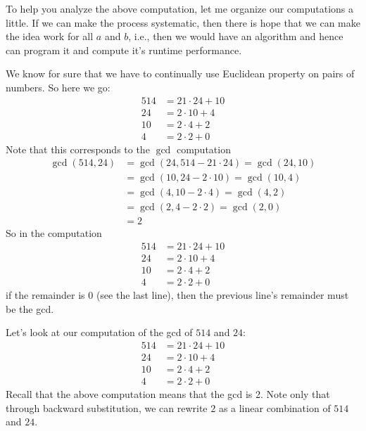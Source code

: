 \newpage
To help you analyze the above computation,
let me organize our computations a little.
If we can make the process systematic, then there is hope that we can 
make the idea work for all $a$ and $b$, i.e., then we would have an
algorithm and hence can program it and compute it's runtime performance.

We know for sure that we have to continually use
Euclidean property on pairs of numbers.
So here we go:
\begin{align*}
514 &= 21 \cdot 24 + 10 \\
24  &= 2 \cdot 10 + 4 \\
10  &= 2 \cdot 4 + 2 \\
4   &= 2 \cdot 2 + 0
\end{align*}
Note that this corresponds to the $\gcd$ computation
\begin{align*}
\gcd(514, 24) 
&= \gcd(24, 514 - 21 \cdot 24) = \gcd(24, 10) \\
&= \gcd(10, 24 - 2 \cdot 10) = \gcd(10, 4) \\
&= \gcd(4, 10 - 2 \cdot 4) = \gcd(4, 2)  \\
&= \gcd(2, 4 - 2\cdot 2) = \gcd(2, 0) \\
&= 2
\end{align*}
So in the computation
\begin{align*}
514 &= 21 \cdot 24 + 10 \\
24  &= 2 \cdot 10 + 4 \\
10  &= 2 \cdot 4 + 2 \\
4   &= 2 \cdot 2 + 0
\end{align*}
if the remainder is $0$ (see the last line), 
then the previous line's remainder must be the gcd.

Let's look at our computation of the gcd of $514$ and $24$:
\begin{align*}
514 &= 21 \cdot 24 + 10 \\
24  &= 2 \cdot 10 + 4 \\
10  &= 2 \cdot 4 + 2 \\
4   &= 2 \cdot 2 + 0
\end{align*}
Recall that the above computation means that the gcd is 2.
Note only that through backward substitution, we can rewrite
$2$ as a linear combination of $514$ and $24$.

